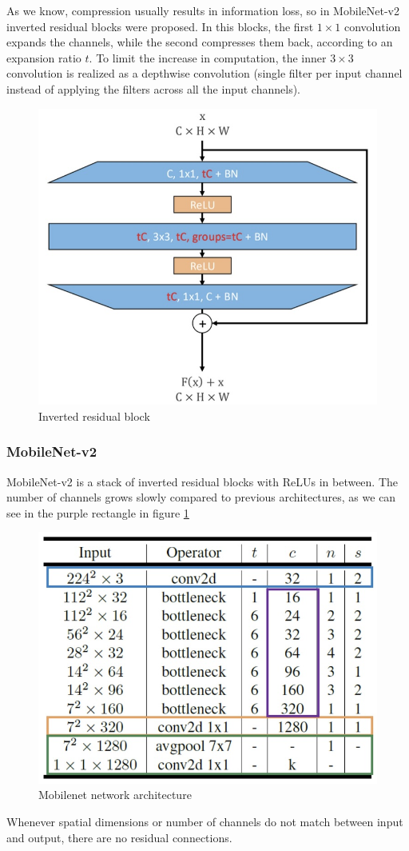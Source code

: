 As we know, compression usually results in information loss, so in MobileNet-v2 inverted residual blocks were proposed.
In this blocks, the first $1\times 1$ convolution expands the channels, while the second compresses them back, according to an expansion ratio $t$.
To limit the increase in computation, the inner $3\times 3$ convolution is realized as a depthwise convolution (single filter per input channel instead of applying the filters across all the input channels).

\begin{figure}[htbp]
  \centering
  \includegraphics[width=0.4\linewidth]{./img/inverted_residual.jpg}
  \caption{Inverted residual block}
\end{figure}

\subsubsection{MobileNet-v2}
MobileNet-v2 is a stack of inverted residual blocks with ReLUs in between.
The number of channels grows slowly compared to previous architectures, as we can see in the purple rectangle in figure \ref{fig:mobilenet}

\begin{figure}[htbp]
  \centering
  \includegraphics[width=0.5\linewidth]{./img/mobilenet.jpg}
  \caption{Mobilenet network architecture}
  \label{fig:mobilenet}
\end{figure}

Whenever spatial dimensions or number of channels do not match between input and output, there are no residual connections.

